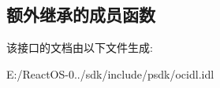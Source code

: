 \subsection*{额外继承的成员函数}


该接口的文档由以下文件生成\+:\begin{DoxyCompactItemize}
\item 
E\+:/\+React\+O\+S-\/0../sdk/include/psdk/ocidl.\+idl\end{DoxyCompactItemize}

